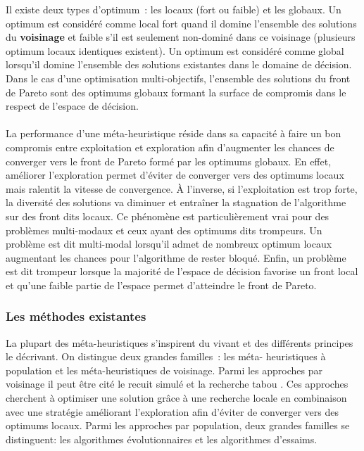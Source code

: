 \begin{Def}\label{def:optimum}
Il existe deux types d’optimum~: les locaux (fort ou faible) et les globaux. Un
optimum est considéré comme local fort quand il domine l’ensemble des solutions du
\textbf{voisinage} et faible s’il est seulement non-dominé dans ce voisinage (plusieurs
optimum locaux identiques existent). Un optimum est considéré comme global
lorsqu’il domine l’ensemble des solutions existantes dans le domaine de
décision. Dans le cas d’une optimisation multi-objectifs, l’ensemble des
solutions du front de Pareto sont des optimums globaux formant la surface de
compromis dans le respect de l’espace de décision.
\end{Def}

\paragraph{} %
La performance d’une méta-heuristique réside dans sa capacité à faire un bon
compromis entre exploitation et exploration afin d’augmenter les chances de
converger vers le front de Pareto formé par les optimums globaux. En effet,
améliorer l’exploration permet d’éviter de converger vers des optimums locaux
mais ralentit la vitesse de convergence. À l’inverse, si l’exploitation est trop
forte, la diversité des solutions va diminuer et entraîner la stagnation de
l’algorithme sur des front dits locaux. Ce phénomène est particulièrement vrai
pour des problèmes multi-modaux et ceux ayant des optimums dits trompeurs. Un
problème est dit multi-modal lorsqu’il admet de nombreux optimum locaux
augmentant les chances pour l’algorithme de rester bloqué. Enfin, un problème
est dit trompeur lorsque la majorité de l’espace de décision favorise un front
local et qu’une faible partie de l’espace permet d’atteindre le front de Pareto.


\subsubsection{Les méthodes existantes} %
\label{ssub:les_methodes_existantes}
La plupart des méta-heuristiques s’inspirent du vivant et des différents principes le
décrivant. On distingue deux grandes familles~: les méta- heuristiques à population et les
méta-heuristiques de voisinage. Parmi les approches par
voisinage il peut être cité le recuit simulé et la recherche tabou
\parencite{Paul2010577}. Ces approches cherchent à optimiser une solution grâce à une
recherche locale en combinaison avec une stratégie améliorant l’exploration afin d’éviter
de converger vers des optimums locaux. Parmi les approches par population, deux grandes
familles se distinguent: les algorithmes évolutionnaires et les algorithmes d’essaims.

